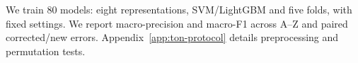 We train 80 models: eight representations, SVM/LightGBM and five folds, with fixed settings. We report macro-precision and macro-F1 across A--Z and paired corrected/new errors. Appendix~\ref{app:ton-protocol} details preprocessing and permutation tests.
